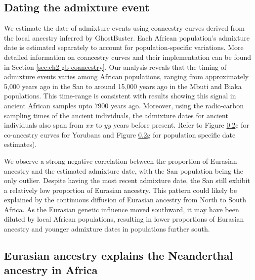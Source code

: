 \subsection{Dating the admixture event}

We estimate the date of admixture events using coancestry curves derived from the local ancestry inferred by GhostBuster. Each African population's admixture date is estimated separately to account for population-specific variations. More detailed information on coancestry curves and their implementation can be found in Section \ref{sec:ch2-gb-coancestry}. Our analysis reveals that the timing of admixture events varies among African populations, ranging from approximately 5,000 years ago in the San to around 15,000 years ago in the Mbuti and Biaka populations. This time-range is consistent with results showing this signal in ancient African samples upto 7900 years ago. Moreover, using the radio-carbon sampling times of the ancient individuals, the admixture dates for ancient individuals also span from $xx$ to $yy$ years before present. Refer to Figure \ref{}c for co-ancestry curves for Yorubans and Figure \ref{}g for population specific date estimates).

We observe a strong negative correlation between the proportion of Eurasian ancestry and the estimated admixture date, with the San population being the only outlier. Despite having the most recent admixture date, the San still exhibit a relatively low proportion of Eurasian ancestry. This pattern could likely be explained by the continuous diffusion of Eurasian ancestry from North to South Africa. As the Eurasian genetic influence moved southward, it may have been diluted by local African populations, resulting in lower proportions of Eurasian ancestry and younger admixture dates in populations further south.


\subsection{Eurasian ancestry explains the Neanderthal ancestry in Africa}

